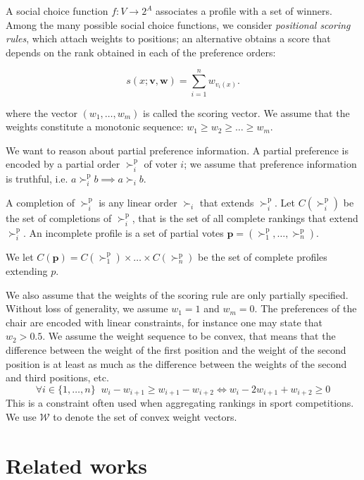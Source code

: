 \documentclass[12pt]{article}
\newcommand{\pref}{\succ}%
\newcommand{\ppref}{\succ^\text{p}}%
\newcommand{\profile}{\textbf{v}}%
\newcommand{\w}{\textbf{w}}%
\begin{document}
A social choice function $f : V \rightarrow 2^A$ associates a profile with a set of winners.
Among the many possible social choice functions, we consider {\em positional scoring rules}, which attach weights to positions; an alternative obtains a score that depends on the rank obtained in each of the preference orders:

\[ s(x; \profile, \w) = \sum_{i=1}^{n} w_{v_i(x)}. \]

where the vector $(w_1,\ldots,w_m)$ is called the scoring vector. We assume that the weights constitute a monotonic sequence: $w_{1} \geq w_{2} \geq \ldots \geq w_{m}$.

\medskip
We want to reason about partial preference information.
A partial preference  is encoded by a partial order $\ppref_i$  of voter $i$;
we assume that preference information is truthful, i.e. $a \ppref_i b \implies a \pref_i b$.

A completion of $\ppref_i$ is any linear order $\pref_i$ that extends $\ppref_i$.
Let $C(\ppref_i)$ be the set of completions of $\ppref_i$, that is the set of all complete rankings that extend $\ppref_i$.
An incomplete profile is a set of partial votes %
$\textbf{p}=(\ppref_1,\ldots,\ppref_n)$.

We let $C(\textbf{p})=C(\ppref_1)\times \ldots \times C(\ppref_n)$ be the set of complete profiles extending $p$.

\medskip
We also assume that the weights of the scoring rule are only partially specified.
Without loss of generality, we assume $w_1=1$ and $w_m=0$.
The preferences of the chair are encoded with linear constraints, for instance one may state
that $w_2>0.5$.
We assume the weight sequence to be convex, that means that the difference between the weight of the first position and the weight of the second position is at least as much as the difference between the weights of the second and third positions, etc. 
\[ \forall i \in \{1,\ldots,n\} \;\; w_i - w_{i+1} \geq w_{i+1}-w_{i+2} \iff  w_i - 2 w_{i+1} + w_{i+2} \geq 0 \]
This is a constraint often used when aggregating rankings in sport competitions.
We use $\mathcal{W}$ to denote the set of convex weight vectors.

\section{Related works}
\end{document}
